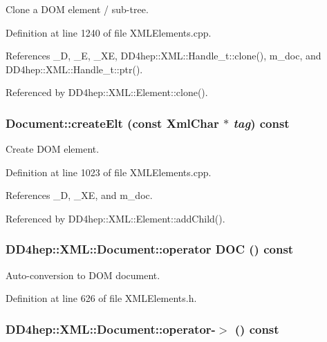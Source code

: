 Clone a DOM element / sub-\/tree. 

Definition at line 1240 of file XMLElements.cpp.

References \_\-D, \_\-E, \_\-XE, DD4hep::XML::Handle\_\-t::clone(), m\_\-doc, and DD4hep::XML::Handle\_\-t::ptr().

Referenced by DD4hep::XML::Element::clone().\hypertarget{class_d_d4hep_1_1_x_m_l_1_1_document_a5fe0eaacbfdbc877890d485fbb92017f}{
\subsubsection[{createElt}]{ Document::createElt (const {\bf XmlChar} $\ast$ {\em tag}) const}}
\label{class_d_d4hep_1_1_x_m_l_1_1_document_a5fe0eaacbfdbc877890d485fbb92017f}


Create DOM element. 

Definition at line 1023 of file XMLElements.cpp.

References \_\-D, \_\-XE, and m\_\-doc.

Referenced by DD4hep::XML::Element::addChild().\hypertarget{class_d_d4hep_1_1_x_m_l_1_1_document_a1fcde4cc17c1e99e300164c390db6123}{
\subsubsection[{operator DOC}]{\setlength{\rightskip}{0pt plus 5cm}DD4hep::XML::Document::operator {\bf DOC} () const}}
\label{class_d_d4hep_1_1_x_m_l_1_1_document_a1fcde4cc17c1e99e300164c390db6123}


Auto-\/conversion to DOM document. 

Definition at line 626 of file XMLElements.h.\hypertarget{class_d_d4hep_1_1_x_m_l_1_1_document_a17dd174a1b4e575582f55264f81e30d0}{
\subsubsection[{operator-\/$>$}]{ DD4hep::XML::Document::operator-\/$>$ () const}}
\label{class_d_d4hep_1_1_x_m_l_1_1_document_a17dd174a1b4e575582f55264f81e30d0}


